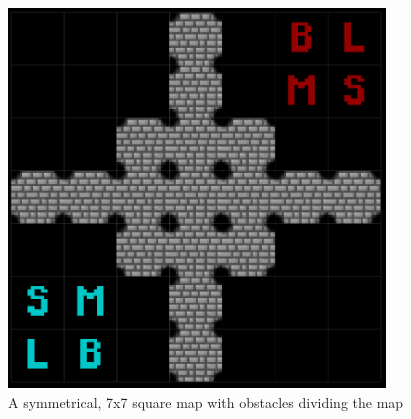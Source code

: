 \documentclass[11pt, a4paper]{report}
\begin{document}
\begin{appendices}
\begin{figure}[!h]
  \centering
  \includegraphics[width=10cm]{img/map_cross_with_block_7x7.png}
  \caption{A symmetrical, 7x7 square map with obstacles dividing the map}
  \label{fig:mapCrossWithBlock7x7}
\end{figure}

\end{appendices}
\end{document}

